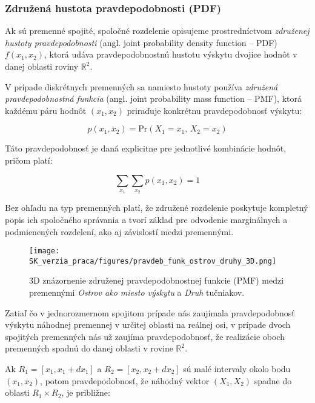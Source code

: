 \subsubsection{Združená hustota pravdepodobnosti (PDF)}\label{subsec:joint_pdf}

Ak sú premenné spojité, spoločné rozdelenie opisujeme prostredníctvom \textit{združenej hustoty pravdepodobnosti} (angl. joint probability density function – PDF) $f(x_1, x_2)$, ktorá udáva pravdepodobnostnú hustotu výskytu dvojice hodnôt v danej oblasti roviny $\mathbb{R}^2$.

V prípade diskrétnych premenných sa namiesto hustoty používa \textit{združená pravdepodobnostná funkcia} (angl. joint probability mass function – PMF), ktorá každému páru hodnôt $(x_1, x_2)$ priraďuje konkrétnu pravdepodobnosť výskytu: 

\begin{equation}
p(x_1, x_2) = \mathrm{Pr}(X_1 = x_1,\, X_2 = x_2)
\end{equation}

Táto pravdepodobnosť je daná explicitne pre jednotlivé kombinácie hodnôt, pričom platí:

\begin{equation}
\sum_{x_1} \sum_{x_2} p(x_1, x_2) = 1
\end{equation}

Bez ohľadu na typ premenných platí, že združené rozdelenie poskytuje kompletný popis ich spoločného správania a tvorí základ pre odvodenie marginálnych a podmienených rozdelení, ako aj závislostí medzi premennými.

\begin{figure}[H]
    \centering
    \texttt{[image: SK\_verzia\_praca/figures/pravdeb\_funk\_ostrov\_druhy\_3D.png]}
    \caption{3D znázornenie združenej pravdepodobnostnej funkcie (PMF) medzi premennými \textit{Ostrov ako miesto výskytu} a \textit{Druh} tučniakov.}
    \label{fig:miesto_druh_joint_density}
\end{figure}

Zatiaľ čo v jednorozmernom spojitom prípade nás zaujímala pravdepodobnosť výskytu náhodnej premennej v určitej oblasti na reálnej osi, v prípade dvoch spojitých premenných nás už zaujíma pravdepodobnosť, že realizácie oboch premenných spadnú do danej oblasti v rovine $\mathbb{R}^2$.

Ak $R_1 = [x_1, x_1 + dx_1]$ a $R_2 = [x_2, x_2 + dx_2]$ sú malé intervaly okolo bodu $(x_1, x_2)$, potom pravdepodobnosť, že náhodný vektor $(X_1, X_2)$ spadne do oblasti $R_1 \times R_2$, je približne:

